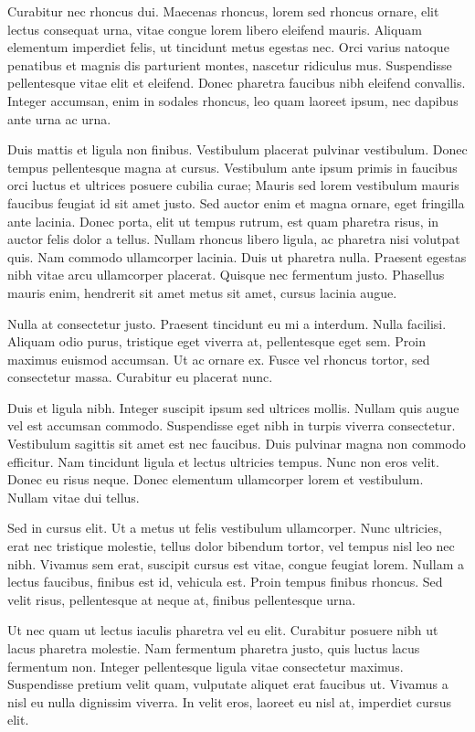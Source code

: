 Curabitur nec rhoncus dui. Maecenas rhoncus, lorem sed rhoncus ornare, elit lectus consequat urna, vitae congue lorem libero eleifend mauris. Aliquam elementum imperdiet felis, ut tincidunt metus egestas nec. Orci varius natoque penatibus et magnis dis parturient montes, nascetur ridiculus mus. Suspendisse pellentesque vitae elit et eleifend. Donec pharetra faucibus nibh eleifend convallis. Integer accumsan, enim in sodales rhoncus, leo quam laoreet ipsum, nec dapibus ante urna ac urna.

Duis mattis et ligula non finibus. Vestibulum placerat pulvinar vestibulum. Donec tempus pellentesque magna at cursus. Vestibulum ante ipsum primis in faucibus orci luctus et ultrices posuere cubilia curae; Mauris sed lorem vestibulum mauris faucibus feugiat id sit amet justo. Sed auctor enim et magna ornare, eget fringilla ante lacinia. Donec porta, elit ut tempus rutrum, est quam pharetra risus, in auctor felis dolor a tellus. Nullam rhoncus libero ligula, ac pharetra nisi volutpat quis. Nam commodo ullamcorper lacinia. Duis ut pharetra nulla. Praesent egestas nibh vitae arcu ullamcorper placerat. Quisque nec fermentum justo. Phasellus mauris enim, hendrerit sit amet metus sit amet, cursus lacinia augue.

Nulla at consectetur justo. Praesent tincidunt eu mi a interdum. Nulla facilisi. Aliquam odio purus, tristique eget viverra at, pellentesque eget sem. Proin maximus euismod accumsan. Ut ac ornare ex. Fusce vel rhoncus tortor, sed consectetur massa. Curabitur eu placerat nunc.

Duis et ligula nibh. Integer suscipit ipsum sed ultrices mollis. Nullam quis augue vel est accumsan commodo. Suspendisse eget nibh in turpis viverra consectetur. Vestibulum sagittis sit amet est nec faucibus. Duis pulvinar magna non commodo efficitur. Nam tincidunt ligula et lectus ultricies tempus. Nunc non eros velit. Donec eu risus neque. Donec elementum ullamcorper lorem et vestibulum. Nullam vitae dui tellus.

Sed in cursus elit. Ut a metus ut felis vestibulum ullamcorper. Nunc ultricies, erat nec tristique molestie, tellus dolor bibendum tortor, vel tempus nisl leo nec nibh. Vivamus sem erat, suscipit cursus est vitae, congue feugiat lorem. Nullam a lectus faucibus, finibus est id, vehicula est. Proin tempus finibus rhoncus. Sed velit risus, pellentesque at neque at, finibus pellentesque urna.

Ut nec quam ut lectus iaculis pharetra vel eu elit. Curabitur posuere nibh ut lacus pharetra molestie. Nam fermentum pharetra justo, quis luctus lacus fermentum non. Integer pellentesque ligula vitae consectetur maximus. Suspendisse pretium velit quam, vulputate aliquet erat faucibus ut. Vivamus a nisl eu nulla dignissim viverra. In velit eros, laoreet eu nisl at, imperdiet cursus elit.